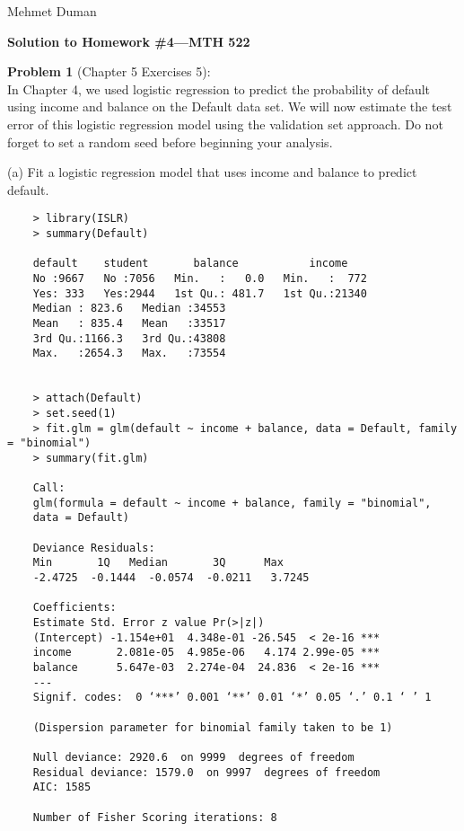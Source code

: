 \documentclass{article}
\begin{document}
\begin{flushright}
	Mehmet Duman
\end{flushright}

\begin{center}
{\Large {\bf Solution to Homework \#4---MTH 522} }
\end{center}

{\bf Problem 1} (Chapter 5 Exercises 5):\\

In Chapter 4, we used logistic regression to predict the probability of default using income and balance on the Default data set. We will now estimate the test error of this logistic regression model using the validation set approach. Do not forget to set a random seed before beginning your analysis.

(a) Fit a logistic regression model that uses income and balance to predict default.
\begin{program}
	\begin{verbatim}
	> library(ISLR)
	> summary(Default)
	
	default    student       balance           income     
	No :9667   No :7056   Min.   :   0.0   Min.   :  772  
	Yes: 333   Yes:2944   1st Qu.: 481.7   1st Qu.:21340  
	Median : 823.6   Median :34553  
	Mean   : 835.4   Mean   :33517  
	3rd Qu.:1166.3   3rd Qu.:43808  
	Max.   :2654.3   Max.   :73554  	
	
	
	> attach(Default)
	> set.seed(1)
	> fit.glm = glm(default ~ income + balance, data = Default, family = "binomial") 
	> summary(fit.glm)
	
	Call:
	glm(formula = default ~ income + balance, family = "binomial", 
	data = Default)
	
	Deviance Residuals: 
	Min       1Q   Median       3Q      Max  
	-2.4725  -0.1444  -0.0574  -0.0211   3.7245  
	
	Coefficients:
	Estimate Std. Error z value Pr(>|z|)    
	(Intercept) -1.154e+01  4.348e-01 -26.545  < 2e-16 ***
	income       2.081e-05  4.985e-06   4.174 2.99e-05 ***
	balance      5.647e-03  2.274e-04  24.836  < 2e-16 ***
	---
	Signif. codes:  0 ‘***’ 0.001 ‘**’ 0.01 ‘*’ 0.05 ‘.’ 0.1 ‘ ’ 1
	
	(Dispersion parameter for binomial family taken to be 1)
	
	Null deviance: 2920.6  on 9999  degrees of freedom
	Residual deviance: 1579.0  on 9997  degrees of freedom
	AIC: 1585
	
	Number of Fisher Scoring iterations: 8
	\end{verbatim}
\end{program}
\end{document}
